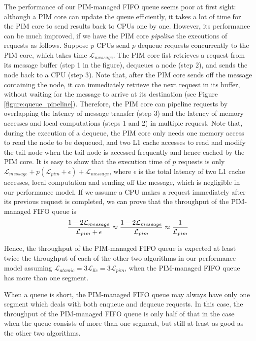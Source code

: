 \documentclass[11pt, letterpaper]{article}   	%
\newcommand{\latpim} {\mathcal{L}_{pim}}
\newcommand{\latllc} {\mathcal{L}_{llc}}
\newcommand{\latato} {\mathcal{L}_{atomic}}
\newcommand{\latmes} {\mathcal{L}_{message}}
\begin{document}
The performance of our PIM-managed FIFO queue seems poor at first sight: although a PIM core can update 
the queue efficiently, it takes a lot of time for the PIM core to send results back to CPUs one by one. 
However, its performance can be much improved, if we have the PIM core \textit{pipeline} 
the executions of requests as follows. 
Suppose $p$ CPUs send $p$ dequeue requests concurrently to the PIM core, which takes time $\latmes$. 
The PIM core fist retrieves a request from its message buffer (step 1 in the figure), 
dequeues a node (step 2), and sends the node back to a CPU (step 3). 
Note that, after the PIM core sends off the message containing the node, it can immediately retrieve the next 
request in its buffer, without waiting for the message to arrive at its destination 
(see Figure \ref{figure:queue_pipeline}). 
Therefore, the PIM core can pipeline requests by overlapping the latency of message transfer (step 3) 
and the latency of memory accesses and local computations (steps 1 and 2) in multiple request. 
Note that, during the execution of a dequeue, the PIM core only needs one memory access to read the node 
to be dequeued, and two L1 cache accesses to read and modify the tail node 
when the tail node is accessed frequently and hence cached by the PIM core.  
It is easy to show that the execution time of $p$ requests is only $\latmes + p(\latpim + \epsilon) + \latmes$, 
where $\epsilon$ is the total latency of two L1 cache accesses, local computation and sending off the message, 
which is negligible in our performance model. 
If we assume a CPU makes a request immediately after its previous request is completed, 
we can prove that the throughput of the PIM-managed FIFO queue is 
$${1 - 2\latmes \over \latpim + \epsilon} \approx {1 - 2\latmes \over \latpim} 
\approx {1 \over \latpim}$$

Hence, the throughput of the PIM-managed FIFO queue is expected at least twice the throughput of each of 
the other two algorithms in our performance model assuming $\latato = 3\latllc = 3\latpim$, 
when the PIM-managed FIFO queue has more than one segment. 

When a queue is short, the PIM-managed FIFO queue may always have only one segment 
which deals with both enqueue and dequeue requests. 
In this case, the throughput of the PIM-managed FIFO queue is only half of that in the case when 
the queue consists of more than one segment, but still at least as good as the other two algorithms. 




\end{document}
